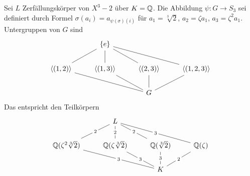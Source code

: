 \begin{Bsp}
    Sei \(L\) Zerfällungskörper von \(X^3-2\) über \(K=\mathbb{Q}\). Die Abbildung 
    \(\psi\colon G\to S_3\) sei definiert durch Formel \(\sigma(a_i)=a_{\psi(\sigma)(i)}\) für \(a_1=\sqrt[3]{2}\), \(a_2=\zeta a_1\), \(a_3=\zeta^2a_1\).
    Untergruppen von \(G\) sind 
    $$%
\begin{tikzcd}
                               & \Set{e} \arrow[ld, no head] \arrow[d, no head] \arrow[rd, no head] \arrow[rrd, no head] &                              &                                 \\
{\anglebr{(1,2)}} \arrow[rrd, no head] & {\anglebr{(1,3)}} \arrow[rd, no head]                                                         & {\anglebr{(2,3)}} \arrow[d, no head] & {\anglebr{(1,2,3)}} \arrow[ld, no head] \\
                               &                                                                                       & G                            &                                
\end{tikzcd}$$
Das entspricht den Teilkörpern 
$$%
\begin{tikzcd}
                                                                & L \arrow[ld, "2" description, no head] \arrow[d, "2" description, no head] \arrow[rd, "2" description, no head] \arrow[rrd, "3" description, no head] &                                                        &                                                 \\
{\QQ(\zeta^2\sqrt[3]{2})} \arrow[rrd, "3" description, no head] & {\QQ(\zeta\sqrt[3]{2})} \arrow[rd, "3" description, no head]                                                                                          & {\QQ(\sqrt[3]{2})} \arrow[d, "3" description, no head] & \QQ(\zeta) \arrow[ld, "2" description, no head] \\
                                                                &                                                                                                                                                       & K                                                      &                                                
\end{tikzcd}$$
\end{Bsp}
